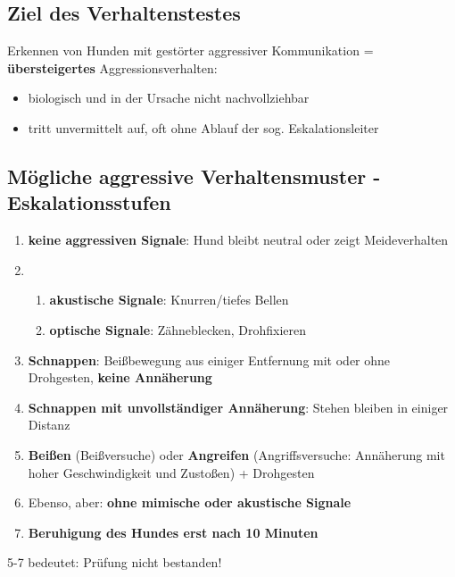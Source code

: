     \subsection{Ziel des Verhaltenstestes}
        Erkennen von Hunden mit gestörter aggressiver Kommunikation = \textbf{übersteigertes} Aggressionsverhalten:
        \begin{itemize}
            \item biologisch und in der Ursache nicht nachvollziehbar
            \item tritt unvermittelt auf, oft ohne Ablauf der sog. Eskalationsleiter
        \end{itemize}

    \subsection{Mögliche aggressive Verhaltensmuster - Eskalationsstufen}
        \begin{enumerate}
            \item \textbf{keine aggressiven Signale}: Hund bleibt neutral oder zeigt Meideverhalten
            \item \begin{enumerate}
                    \item \textbf{akustische Signale}: Knurren/tiefes Bellen
                    \item \textbf{optische Signale}: Zähneblecken, Drohfixieren
                \end{enumerate}
            \item \textbf{Schnappen}: Beißbewegung aus einiger Entfernung mit oder ohne Drohgesten, \textbf{keine Annäherung}
            \item \textbf{Schnappen mit unvollständiger Annäherung}: Stehen bleiben in einiger Distanz
            \item \textbf{Beißen} (Beißversuche) oder \textbf{Angreifen} (Angriffsversuche: Annäherung mit hoher Geschwindigkeit und Zustoßen) + Drohgesten
            \item Ebenso, aber: \textbf{ohne mimische oder akustische Signale}
            \item \textbf{Beruhigung des Hundes erst nach 10 Minuten}
        \end{enumerate}
        5-7 bedeutet: Prüfung nicht bestanden!

